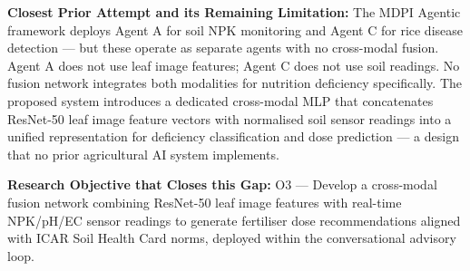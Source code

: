 \documentclass[12pt,a4paper]{article}
\begin{document}
\noindent\textbf{Closest Prior Attempt and its Remaining Limitation:}
The MDPI Agentic framework \cite{agenticmdpi2026} deploys Agent A for soil NPK monitoring and Agent C for rice disease detection --- but these operate as separate agents with no cross-modal fusion. Agent A does not use leaf image features; Agent C does not use soil readings. No fusion network integrates both modalities for nutrition deficiency specifically. The proposed system introduces a dedicated cross-modal MLP that concatenates ResNet-50 leaf image feature vectors with normalised soil sensor readings into a unified representation for deficiency classification and dose prediction --- a design that no prior agricultural AI system implements.

\noindent\textbf{Research Objective that Closes this Gap:}
O3 --- Develop a cross-modal fusion network combining ResNet-50 leaf image features with real-time NPK/pH/EC sensor readings to generate fertiliser dose recommendations aligned with ICAR Soil Health Card norms, deployed within the conversational advisory loop.
\end{document}
